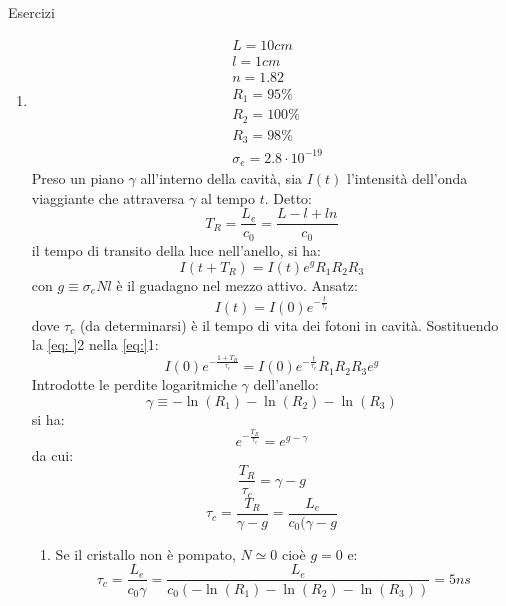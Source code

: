 \documentclass{book}
\def \s {\sigma}
\theoremstyle{remark}
\begin{document}
Esercizi
\begin{enumerate}
\item \begin{align*}[l]
&L = 10 cm\\
&l = 1cm\\
&n = 1.82\\
&R_1 = 95\%\\
&R_2 = 100\%\\
&R_3 = 98\%\\
&\s_e = 2.8 \cdot 10^{-19}
\end{align*}
Preso un piano $\gamma$ all'interno della cavità, sia $I(t)$ l'intensità dell'onda viaggiante che attraversa $\gamma$ al tempo $t$. Detto:
\begin{equation*}
T_R = \frac{L_e}{c_0} = \frac{L - l + ln}{c_0}
\end{equation*}
il tempo di transito della luce nell'anello, si ha:
\begin{equation*}
I(t + T_R) = I(t) e^g R_1R_2R_3
\end{equation*}
con $g\equiv\s_eNl$ è il guadagno nel mezzo attivo.
Ansatz:
\begin{equation*}
I(t) = I(0) e^{-\frac{t}{\tau_c}}
\end{equation*}
dove $\tau_c$ (da determinarsi) è il tempo di vita dei fotoni in cavità.
Sostituendo la \eqref{eq: }2 nella \eqref{eq:}1:
\begin{equation*}
I(0) e^{-\frac{1+T_R}{\tau_c}} = I(0) e^{-\frac{t}{\tau_c}} R_1R_2R_3 e^g
\end{equation*}
Introdotte le perdite logaritmiche $\gamma$ dell'anello:
\begin{equation*}
\gamma \equiv -\ln(R_1) -\ln(R_2) -\ln(R_3)
\end{equation*}
si ha:
\begin{equation*}
e^{-\frac{T_R}{\tau_c}} = e^{g-\gamma}
\end{equation*}
da cui:
\begin{equation*}
\frac{T_R}{\tau_c} = \gamma - g
\end{equation*}
\begin{equation*}
\tau_c = \frac{T_R}{\gamma - g} = \frac{L_e}{c_0(\gamma - g}
\end{equation*}
\begin{enumerate}
\item Se il cristallo non è pompato, $N\simeq 0$ cioè $g=0$ e:
\begin{equation*}
\tau_c = \frac{L_e}{c_0 \gamma} = \frac{L_e}{c_0 (-\ln(R_1) -\ln(R_2) -\ln(R_3))} = 5 ns
\end{equation*}

\end{enumerate}
\end{enumerate}
\end{document}
